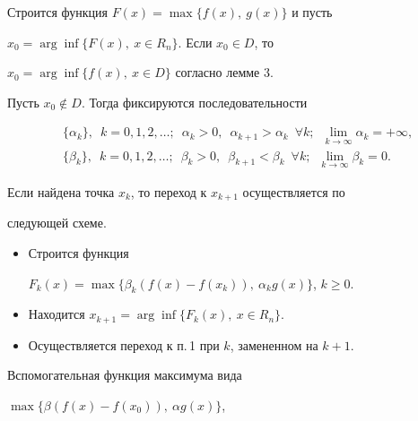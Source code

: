 \begin{alg} Строится функция $F(x)=\max\{f(x),\ g(x)\}$ и пусть 


$x_0=\arg\inf\{F(x),\ x\in R_n\}$. Если $x_0\in D$, то 


$x_0=\arg\inf\{f(x),\ x\in D\}$ согласно лемме 3. 


 


Пусть $x_0\notin D$. Тогда фиксируются последовательности 


\begin{align*} 


&\{\alpha_k\},\ \;k=0,1,2,\dotsc;\ \;\alpha_k>0, 


\ \;\alpha_{k+1}>\alpha_k\ \;\forall k; 


\ \;\lim_{k\to\infty}\alpha_k=+\infty,\\ 


&\{\beta_k\},\ \;k=0,1,2,\dotsc;\ \;\beta_k>0, 


\ \;\beta_{k+1}<\beta_k\ \;\forall k; 


\ \;\lim_{k\to\infty}\beta_k=0.


\end{align*} 


 


Если найдена точка $x_k$, то переход к $x_{k+1}$ осуществляется по 


следующей схеме. 


\begin{itemize} 


\item[1.] Строится функция 


$F_k(x)=\max\{\beta_k(f(x)-f(x_k)),\ \alpha_k g(x)\}$, $k\ge 0$. 


\item[2.] Находится $x_{k+1}=\arg\inf\{F_k(x),\ x\in R_n\}$. 


\item[3.] Осуществляется переход к п.\,1 при $k$, замененном на $k+1$. 


\end{itemize} 


\end{alg} 


 





Вспомогательная функция максимума вида 


$\max\{\beta(f(x)-f(x_0)),\ \alpha g(x)\}$, 


